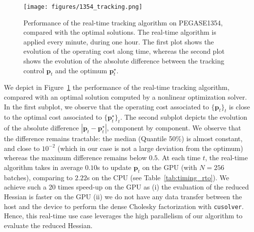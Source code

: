 \begin{figure}[!ht]
    \centering
    \texttt{[image: figures/1354\_tracking.png]}
    \caption{Performance of the real-time tracking algorithm on PEGASE1354, compared
      with the optimal solutions. The real-time algorithm is applied every minute, during one hour.
      The first plot shows the evolution
      of the operating cost along time, whereas the second plot shows the evolution
      of the absolute difference between the tracking control $\bm{p}_t$ and the optimum
    $\bm{p}_t^\star$.}
    \label{fig:rto}
\end{figure}
We depict in Figure~\ref{fig:rto} the performance of the real-time tracking algorithm, compared
with an optimal solution computed by a nonlinear optimization solver.
In the first subplot, we observe that the operating cost associated
to $\{\bm{p}_t\}_t$ is close to the optimal cost associated to $\{\bm{p}_t^\star\}_t$.
The second subplot depicts the evolution of the absolute difference $| \bm{p}_t - \bm{p}_t^\star|$,
component by component. We observe that the difference remains tractable: the median
(Quantile 50\%) is almost constant, and close to $10^{-2}$ (which in our case is not a large deviation
from the optimum) whereas the maximum difference remains below $0.5$. At each time $t$, the real-time
algorithm takes in average $0.10$s to update $\bm{p}_t$ on the GPU (with $N=256$ batches), comparing
to $2.22$s on the CPU (see Table~\ref{tab:timing_rto}). We achieve such a 20 times speed-up on the GPU
as
(i) the evaluation of the reduced Hessian is faster on the GPU
(ii) we do not have any data transfer between the host and the device to perform
the dense Cholesky factorization with {\tt cusolver}.
Hence, this real-time use case leverages the high parallelism of our algorithm
to evaluate the reduced Hessian.
\begin{table}[!ht]
  \centering
    \caption{Time to update the tracking point $\bm{p}_t$ for {\tt case1354pegase} with the real-time algorithm,
      on the CPU and on the GPU.
    }
    \label{tab:timing_rto}
\end{table}

